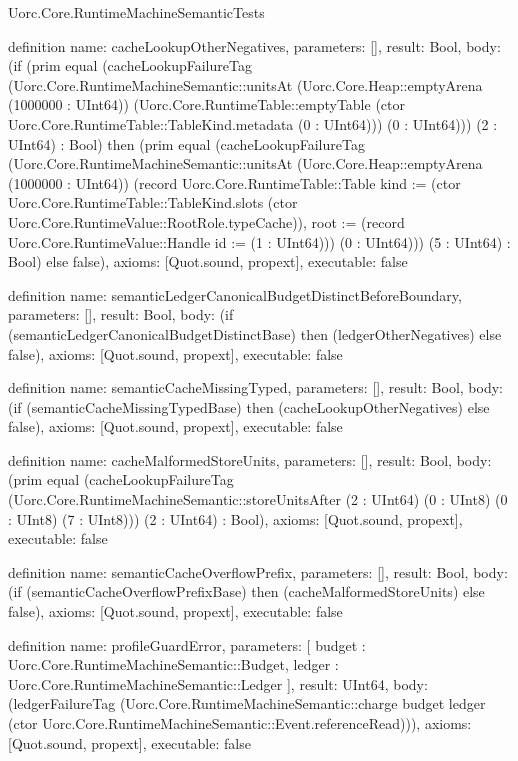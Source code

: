 \begin{lexlean}{Uorc.Core.RuntimeMachineSemanticTests}
\begin{semanticmodule}
definition{
  name: cacheLookupOtherNegatives,
  parameters: [],
  result: Bool,
  body: (if (prim equal (cacheLookupFailureTag (Uorc.Core.RuntimeMachineSemantic::unitsAt (Uorc.Core.Heap::emptyArena (1000000 : UInt64)) (Uorc.Core.RuntimeTable::emptyTable (ctor Uorc.Core.RuntimeTable::TableKind.metadata (0 : UInt64))) (0 : UInt64))) (2 : UInt64) : Bool) then (prim equal (cacheLookupFailureTag (Uorc.Core.RuntimeMachineSemantic::unitsAt (Uorc.Core.Heap::emptyArena (1000000 : UInt64)) (record Uorc.Core.RuntimeTable::Table {kind := (ctor Uorc.Core.RuntimeTable::TableKind.slots (ctor Uorc.Core.RuntimeValue::RootRole.typeCache)), root := (record Uorc.Core.RuntimeValue::Handle {id := (1 : UInt64)})}) (0 : UInt64))) (5 : UInt64) : Bool) else false),
  axioms: [Quot.sound, propext],
  executable: false
}

definition{
  name: semanticLedgerCanonicalBudgetDistinctBeforeBoundary,
  parameters: [],
  result: Bool,
  body: (if (semanticLedgerCanonicalBudgetDistinctBase) then (ledgerOtherNegatives) else false),
  axioms: [Quot.sound, propext],
  executable: false
}

definition{
  name: semanticCacheMissingTyped,
  parameters: [],
  result: Bool,
  body: (if (semanticCacheMissingTypedBase) then (cacheLookupOtherNegatives) else false),
  axioms: [Quot.sound, propext],
  executable: false
}

definition{
  name: cacheMalformedStoreUnits,
  parameters: [],
  result: Bool,
  body: (prim equal (cacheLookupFailureTag (Uorc.Core.RuntimeMachineSemantic::storeUnitsAfter (2 : UInt64) (0 : UInt8) (0 : UInt8) (7 : UInt8))) (2 : UInt64) : Bool),
  axioms: [Quot.sound, propext],
  executable: false
}

definition{
  name: semanticCacheOverflowPrefix,
  parameters: [],
  result: Bool,
  body: (if (semanticCacheOverflowPrefixBase) then (cacheMalformedStoreUnits) else false),
  axioms: [Quot.sound, propext],
  executable: false
}

definition{
  name: profileGuardError,
  parameters: [
    budget : Uorc.Core.RuntimeMachineSemantic::Budget,
    ledger : Uorc.Core.RuntimeMachineSemantic::Ledger
  ],
  result: UInt64,
  body: (ledgerFailureTag (Uorc.Core.RuntimeMachineSemantic::charge budget ledger (ctor Uorc.Core.RuntimeMachineSemantic::Event.referenceRead))),
  axioms: [Quot.sound, propext],
  executable: false
}


\end{semanticmodule}
\end{lexlean}
